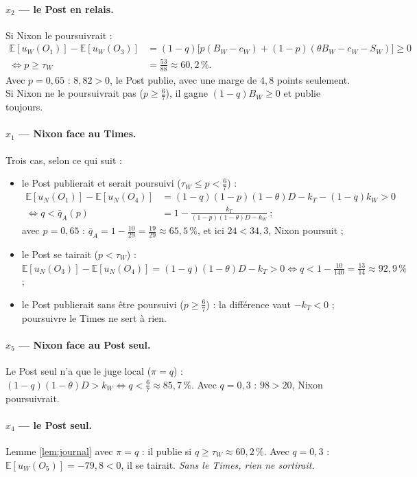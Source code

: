 \documentclass[11pt,a4paper]{article}
\theoremstyle{definition}
\newcommand{\E}{\mathbb{E}}
\begin{document}
\paragraph{$x_2$ — le Post en relais.} Si Nixon le poursuivrait :
\begin{align*}
\E[u_W(O_1)]-\E[u_W(O_3)]&=(1-q)\big[p(B_W-c_W)+(1-p)(\theta B_W-c_W-S_W)\big]\ge0\\
\iff p\ge\tau_W&=\frac{53}{88}\approx60,2\,\%.
\end{align*}
Avec $p=0,65$ : $8,82>0$, le Post publie, avec une marge de $4,8$ points seulement. Si Nixon ne le poursuivrait pas ($p\ge\frac67$), il gagne $(1-q)B_W\ge0$ et publie toujours.

\paragraph{$x_1$ — Nixon face au Times.} Trois cas, selon ce qui suit :
\begin{itemize}[leftmargin=*,itemsep=2pt]
\item le Post publierait et serait poursuivi ($\tau_W\le p<\frac67$) :
\begin{align*}
\E[u_N(O_1)]-\E[u_N(O_4)]&=(1-q)(1-p)(1-\theta)D-k_T-(1-q)k_W>0\\
\iff q<\bar q_A(p)&=1-\frac{k_T}{(1-p)(1-\theta)D-k_W}\ ;
\end{align*}
avec $p=0,65$ : $\bar q_A=1-\frac{10}{29}=\frac{19}{29}\approx65,5\,\%$, et ici $24<34,3$, Nixon poursuit ;
\item le Post se tairait ($p<\tau_W$) : $\E[u_N(O_3)]-\E[u_N(O_4)]=(1-q)(1-\theta)D-k_T>0\iff q<1-\frac{10}{140}=\frac{13}{14}\approx92,9\,\%$ ;
\item le Post publierait sans être poursuivi ($p\ge\frac67$) : la différence vaut $-k_T<0$ ; poursuivre le Times ne sert à rien.
\end{itemize}

\paragraph{$x_5$ — Nixon face au Post seul.} Le Post seul n'a que le juge local ($\pi=q$) :
$(1-q)(1-\theta)D>k_W\iff q<\frac67\approx85,7\,\%$. Avec $q=0,3$ : $98>20$, Nixon poursuivrait.

\paragraph{$x_4$ — le Post seul.} Lemme \ref{lem:journal} avec $\pi=q$ : il publie si $q\ge\tau_W\approx60,2\,\%$. Avec $q=0,3$ : $\E[u_W(O_5)]=-79,8<0$, il se tairait. \emph{Sans le Times, rien ne sortirait.}
\end{document}
